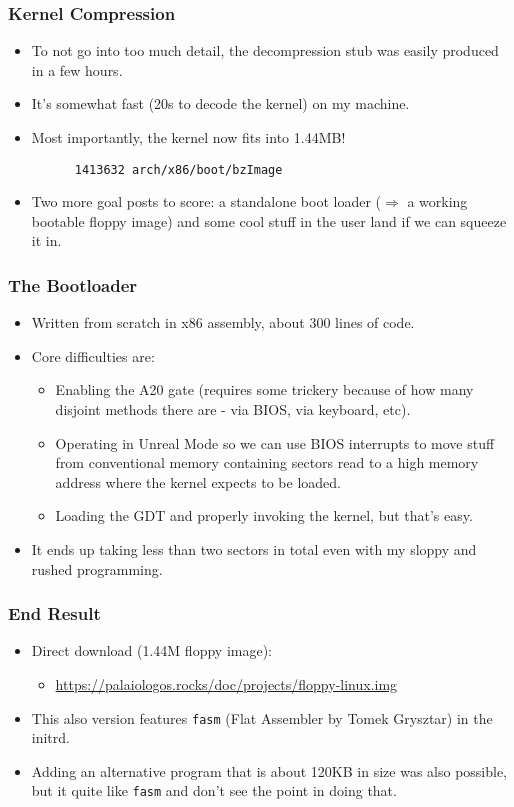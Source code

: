 \documentclass{beamer}
\begin{document}
\begin{frame}[t,fragile]
\frametitle{Kernel Compression}
  \begin{itemize}
    \item To not go into too much detail, the decompression stub was easily produced in a few hours.
    \item It's somewhat fast (20s to decode the kernel) on my machine.
    \item Most importantly, the kernel now fits into 1.44MB!
    \begin{Verbatim}
      1413632 arch/x86/boot/bzImage
    \end{Verbatim}
    \item Two more goal posts to score: a standalone boot loader ($\Rightarrow$ a working bootable floppy image) and some cool stuff in the user land if we can squeeze it in.
  \end{itemize}
\end{frame}

\begin{frame}[t,fragile]
\frametitle{The Bootloader}
  \begin{itemize}
    \item Written from scratch in x86 assembly, about 300 lines of code.
    \item Core difficulties are:
    \begin{itemize}
      \item Enabling the A20 gate (requires some trickery because of how many disjoint methods there are - via BIOS, via keyboard, etc).
      \item Operating in Unreal Mode so we can use BIOS interrupts to move stuff from conventional memory containing sectors read to a high memory address where the kernel expects to be loaded.
      \item Loading the GDT and properly invoking the kernel, but that's easy.
    \end{itemize}
    \item It ends up taking less than two sectors in total even with my sloppy and rushed programming.
  \end{itemize}
\end{frame}

\begin{frame}[t,fragile]
\frametitle{End Result}
  \begin{itemize}
    \item Direct download (1.44M floppy image):
    \begin{itemize}
      \item \url{https://palaiologos.rocks/doc/projects/floppy-linux.img}
    \end{itemize}
    \item This also version features \verb|fasm| (Flat Assembler by Tomek Grysztar) in the initrd.
    \item Adding an alternative program that is about 120KB in size was also possible, but it quite like \verb|fasm| and don't see the point in doing that.
  \end{itemize}
\end{frame}
\end{document}
